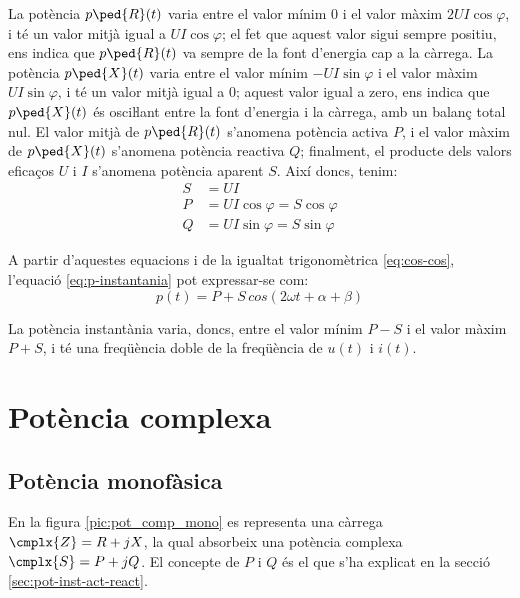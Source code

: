 La potència $p\ped{R}(t)$ varia entre el valor mínim 0 i el valor màxim $2 U I \cos\varphi$,
i té un valor mitjà igual a $U I \cos\varphi$; el fet que aquest valor sigui sempre positiu,
ens indica que $p\ped{R}(t)$  va sempre de la font d'energia cap a la càrrega.
La potència $p\ped{X}(t)$ varia entre el valor mínim $-U I \sin\varphi$ i el valor
màxim $U I \sin\varphi$, i té un valor mitjà igual a 0; aquest valor igual a zero,
ens indica que $p\ped{X}(t)$ és osciŀlant entre la font d'energia i la càrrega,
amb un balanç total nul. El valor mitjà de $p\ped{R}(t)$ s'anomena potència activa $P$, i el
valor màxim de $p\ped{X}(t)$ s'anomena potència reactiva $Q$; finalment, el producte dels valors
eficaços $U$ i $I$ s'anomena potència aparent $S$. Així doncs, tenim:
\begin{align}
  S &= U I \\
  P &= U I \cos\varphi = S \cos\varphi\\
  Q &= U I \sin\varphi = S \sin\varphi
\end{align}

A partir d'aquestes equacions i de la igualtat trigonomètrica \eqref{eq:cos-cos}, l'equació \eqref{eq:p-instantania} pot expressar-se com:
\begin{equation}
	p(t) = P + S \,cos(2 \omega t + \alpha +  \beta)
\end{equation}

La potència instantània varia, doncs, entre el valor mínim $P - S$ i el valor màxim $P + S$, i té una freqüència doble de la freqüència de $u(t)$ i $i(t)$.

\section{Potència complexa}\label{sec:pot_complex} 

\subsection{Potència monofàsica} \label{sec:pot-monof}

En la figura \vref{pic:pot_comp_mono} es representa una càrrega $\cmplx{Z}=R+j X$, la
qual absorbeix una potència complexa $\cmplx{S} = P + j Q$. El concepte de $P$ i $Q$ és el  que s'ha explicat en la secció \ref{sec:pot-inst-act-react}.
\begin{center}
    
    \label{pic:pot_comp_mono}
\end{center}

